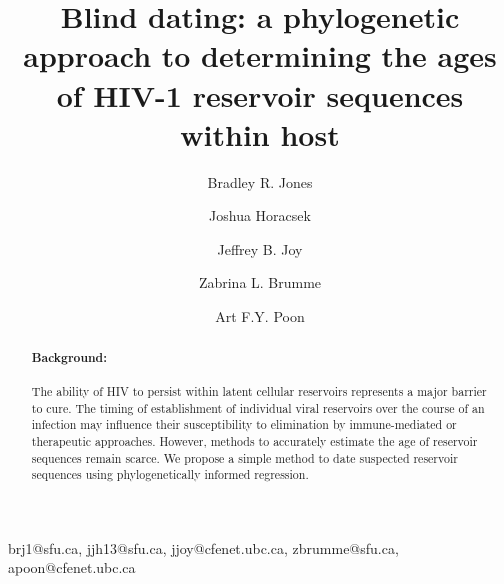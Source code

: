\documentclass{bmcart}
\begin{document}

\begin{frontmatter}

\begin{fmbox}

\dochead{}

\title{Blind dating: a phylogenetic approach to determining the ages of HIV-1 reservoir sequences within host}

\author[addressref={1,2},email={brj1@sfu.ca}]{Bradley R. Jones} %
\author[addressref={1,2},email={jjh13@sfu.ca}]{Joshua Horacsek} %
\author[addressref={2,3},email={jjoy@cfenet.ubc.ca}]{Jeffrey B. Joy} %
\author[addressref={1,2},email={zbrumme@sfu.ca}]{Zabrina L. Brumme} %
\author[addressref={2,3},email={apoon@cfenet.ubc.ca},corref={3}]{Art F.Y. Poon} %
\address[id=1]{  }
\address[id=2]{  }
\address[id=3]{    }

brj1@sfu.ca, jjh13@sfu.ca, jjoy@cfenet.ubc.ca, zbrumme@sfu.ca, apoon@cfenet.ubc.ca
 
\printaddresses



\begin{artnotes}
\end{artnotes}

\end{fmbox}

\begin{abstractbox}
\begin{abstract}
\paragraph{Background:}
The ability of HIV to persist within latent cellular reservoirs represents a major barrier to
cure.
The timing of establishment of individual viral reservoirs over the course of an infection may influence their susceptibility to elimination by immune-mediated or therapeutic approaches.
However, methods to accurately estimate the age of reservoir sequences remain scarce.
We propose a simple method to date suspected reservoir sequences using phylogenetically informed regression.
 

\end{abstract}
\end{abstractbox}
\end{frontmatter}
\end{document}
